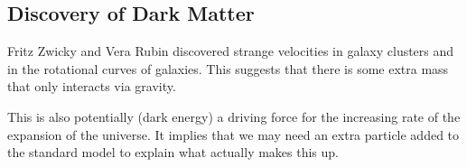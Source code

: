 \subsection{Discovery of Dark Matter}
Fritz Zwicky and Vera Rubin discovered strange velocities in galaxy clusters and in the rotational curves of galaxies. This suggests that there is some extra mass that only interacts via gravity.

This is also potentially (dark energy) a driving force for the increasing rate of the expansion of the universe. It implies that we may need an extra particle added to the standard model to explain what actually makes this up.

